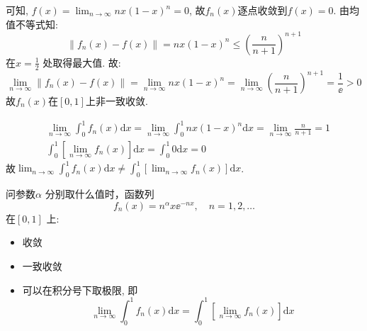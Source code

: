 \begin{solution}
    可知, \(f(x) = \lim_{n \to \infty} nx(1-x)^n = 0\),
    故\(f_{n}(x)\)逐点收敛到\(f(x) = 0\).
    由均值不等式知: \[
        \left\lVert f_{n}(x) - f(x) \right\rVert =
        nx(1-x)^{n} \le \left( \frac{n}{n + 1} \right)^{n+1}
    \]
    在\(x = \frac{1}{2}\) 处取得最大值.
    故: \[
        \lim_{n \to \infty} \left\lVert f_{n}(x) - f(x) \right\rVert
        = \lim_{n \to \infty} nx(1-x)^{n} = \lim_{n \to \infty}
        \left( \frac{n}{n + 1} \right)^{n+1} = \frac{1}{\ee} > 0
    \]
    故\(f_{n}(x)\)在\([0,1]\)上非一致收敛.

    \begin{align*}
        & \lim_{n \to \infty} \int_0^1 f_n(x) \mathrm{d}x
        = \lim_{n \to \infty} \int_0^1 nx(1-x)^n \mathrm{d}x
        = \lim_{n \to \infty} \frac{n}{n+1} = 1
        \\
        & \int_0^1 \left[ \lim_{n \to \infty} f_n(x)
        \right] \mathrm{d}x
        = \int_0^1 0 \mathrm{d}x = 0
    \end{align*}
    故\(\lim_{n \to \infty} \int_0^1 f_n(x) \mathrm{d}x \neq \int_0^1
    \left[\lim_{n \to \infty} f_n(x) \right] \mathrm{d}x\).
\end{solution}

\begin{problem}
    问参数\(\alpha\) 分别取什么值时，函数列
    \[
        f_n(x) = n^\alpha x\ee^{-n x}, \quad n = 1, 2, \dots
    \] 在\([0,1]\) 上:
    \begin{itemize}
        \item 收敛
        \item 一致收敛
        \item 可以在积分号下取极限, 即\[
                \lim_{n \to \infty} \int_0^1 f_n(x)
                \mathrm{d}x = \int_0^1
                \left[ \lim_{n \to \infty} f_n(x) \right] \mathrm{d}x
            \]
    \end{itemize}
\end{problem}

